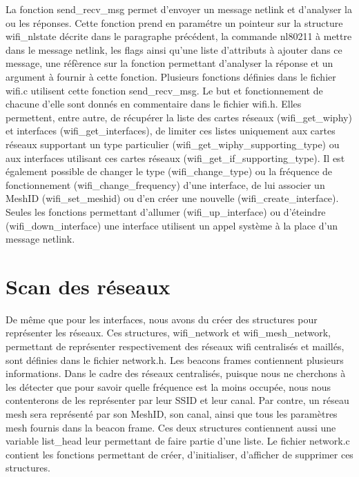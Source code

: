 La fonction send\_\-recv\_\-msg permet d'envoyer un message netlink et d'analyser la ou les réponses. Cette fonction prend en paramétre 
un pointeur sur la structure wifi\_\-nlstate décrite dans le paragraphe précédent, la commande nl80211 à mettre dans le message
netlink, les flags ainsi qu'une liste d'attributs à ajouter dans ce message, une réfèrence sur la fonction permettant d'analyser la 
réponse et un argument à fournir à cette fonction. Plusieurs fonctions définies dans le fichier wifi.c utilisent cette fonction
send\_\-recv\_\-msg. Le but et fonctionnement de chacune d'elle sont donnés en commentaire dans le fichier wifi.h. Elles permettent, 
entre autre, de récupérer la
liste des cartes réseaux (wifi\_\-get\_\-wiphy) et interfaces (wifi\_\-get\_\-interfaces), de limiter ces listes uniquement aux cartes réseaux 
supportant un type particulier (wifi\_\-get\_\-wiphy\_\-supporting\_\-type) ou aux interfaces utilisant ces cartes réseaux
(wifi\_\-get\_\-if\_\-supporting\_\-type). Il est également possible de changer le type (wifi\_\-change\_\-type) ou la fréquence de fonctionnement
(wifi\_\-change\_\-frequency) d'une interface, de lui associer un MeshID (wifi\_\-set\_\-meshid) ou d'en créer une nouvelle 
(wifi\_\-create\_\-interface). Seules les fonctions permettant d'allumer (wifi\_\-up\_\-interface) ou d'éteindre (wifi\_\-down\_\-interface) une 
interface utilisent un appel système à la place d'un message netlink.

\section{Scan des réseaux}

De même que pour les interfaces, nous avons du créer des structures pour représenter les réseaux. Ces structures, wifi\_\-network et 
wifi\_\-mesh\_\-network, permettant de représenter respectivement des réseaux wifi centralisés et maillés, sont définies dans le fichier
network.h. Les beacons frames contiennent plusieurs informations. Dans le cadre des réseaux centralisés, puisque nous ne cherchons
à les détecter que pour savoir quelle fréquence est la moins occupée, nous nous contenterons de les représenter par leur SSID et leur
canal. Par contre, un réseau mesh sera représenté par son MeshID, son canal, ainsi que tous les paramètres mesh fournis dans la
beacon frame. Ces deux structures contiennent aussi une variable list\_\-head leur permettant de faire partie d'une liste.
Le fichier network.c contient les fonctions permettant de créer, d'initialiser, d'afficher de supprimer ces structures.

